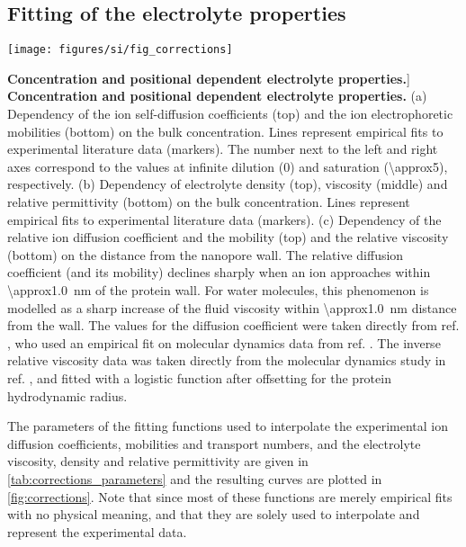 \documentclass[journal=ancac3, manuscript=suppinfo, etalmode=truncate,maxauthors=0]{achemso}
\begin{document}
\subsection{Fitting of the electrolyte properties}

\begin{figure*}[!b]

  \centering
  \texttt{[image: figures/si/fig\_corrections]}

  \caption%
    [\textbf{Concentration and positional dependent electrolyte properties.}]
    {%
      \textbf{Concentration and positional dependent electrolyte properties.}
      (a)
      Dependency of the ion self-diffusion coefficients (top) and the ion electrophoretic mobilities (bottom)
      on the bulk  concentration. Lines represent empirical fits to experimental literature data
      (markers). The number next to the left and right axes correspond to the values at infinite dilution
      (\SI{0}{\Molar}) and saturation (\SI{\approx5}{\Molar}), respectively.
      (b)
      Dependency of electrolyte density (top), viscosity (middle) and relative permittivity (bottom) on
      the bulk  concentration. Lines represent empirical fits to experimental literature data
      (markers).
      (c)
      Dependency of the relative ion diffusion coefficient and the mobility (top) and the relative viscosity
      (bottom) on the distance from the nanopore wall. The relative diffusion coefficient (and its mobility)
      declines sharply when an ion approaches within \SI{\approx1.0}{\nm} of the protein wall. For water
      molecules, this phenomenon is modelled as a sharp increase of the fluid viscosity within
      \SI{\approx1.0}{\nm} distance from the wall. The values for the diffusion coefficient were taken
      directly from ref. , who used an empirical fit on molecular dynamics data from
      ref. . The inverse relative viscosity data was taken directly from the molecular
      dynamics study in ref. , and fitted with a logistic function after offsetting for
      the protein hydrodynamic radius.
  }\label{fig:corrections}
\end{figure*}

The parameters of the fitting functions used to interpolate the experimental ion diffusion coefficients,
mobilities and transport numbers, and the electrolyte viscosity, density and relative permittivity are given
in \cref{tab:corrections_parameters} and the resulting curves are plotted in \cref{fig:corrections}. Note that
since most of these functions are merely empirical fits with no physical meaning, and that they are solely
used to interpolate and represent the experimental data.
\end{document}
